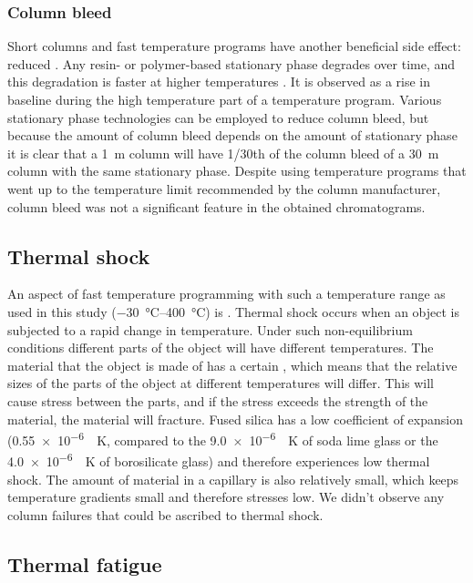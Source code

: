 \subsubsection{Column bleed}
Short columns and fast temperature programs have another beneficial side effect:
reduced . Any resin- or polymer-based stationary phase
degrades over time, and this degradation is faster at higher temperatures
\autocite[p. 66]{Mcnair2019}. It is observed as a rise in baseline during the
high temperature part of a temperature program. Various stationary phase
technologies can be employed to reduce column bleed, but because the amount of
column bleed depends on the amount of stationary phase it is clear that a
\SI{1}{\metre} column will have \num{1/30}th of the column bleed of a
\SI{30}{\metre} column with the same stationary phase. Despite using temperature
programs that went up to the temperature limit recommended by the column
manufacturer, column bleed was not a significant feature in the obtained
chromatograms.

\subsection{Thermal shock}
An aspect of fast temperature programming with such a temperature range as used
in this study (\SIrange{-30}{400}{\celsius}) is . Thermal
shock occurs when an object is subjected to a rapid change in temperature. Under
such non-equilibrium conditions different parts of the object will have
different temperatures. The material that the object is made of has a certain
, which means that the relative sizes
of the parts of the object at different temperatures will differ. This will
cause stress between the parts, and if the stress exceeds the strength of the
material, the material will fracture. Fused silica has a low coefficient of
expansion (\SI{0.55e-6}{\per\kelvin}, compared to the \SI{9.0e-6}{\per\kelvin}
of soda lime glass or the \SI{4.0e-6}{\per\kelvin} of borosilicate glass) and
therefore experiences low thermal shock. The amount of material in a capillary
is also relatively small, which keeps temperature gradients small and therefore
stresses low. We didn't observe any column failures that could be ascribed to 
thermal shock.

\subsection{Thermal fatigue}

